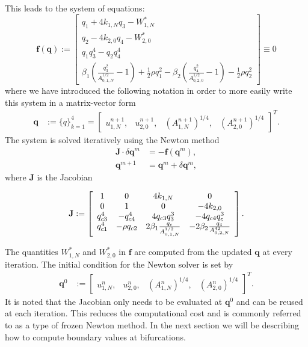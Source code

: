 \documentclass[a4paper, oneside]{discothesis}
\begin{document}
	This leads to the system of equations:
	\begin{equation}
		\mathbf{f}(\mathbf{q}) := \left[\begin{array}{c}
				q_{1}+4 k_{1,N} q_{3}-W_{1,N}^* \\
				q_{2}-4 k_{2,0} q_{4}-W_{2,0}^* \\
				q_{1} q_{3}^4-q_{2} q_{4}^4 \\
				\beta_1\left(\frac{q_{3}^2}{A_{0,1,N}^{1 / 2}}-1\right)+\frac{1}{2} \rho q_{1}^2-\beta_2\left(\frac{q_{4}^2}{A_{0,2,0}^{1 / 2}}-1\right)-\frac{1}{2} \rho q_{2}^2
		\end{array}\right] \equiv 0
	\end{equation}
	where we have introduced the following notation in order to more easily write this system in a matrix-vector form
	\begin{align}
		\mathbf{q}&:= \{q\}_{k=1}^4 = \left[\begin{array}{llll}
				u_{1,N}^{n+1}, & u_{2,0}^{n+1}, & \left( A_{1,N}^{n+1}\right)^{1 / 4}, & \left( A_{2,0}^{n+1} \right)^{1 / 4}
		\end{array}\right]^T. 
			\end{align}
			The system is solved iteratively using the Newton method
			\begin{align}
				\mathbf{J} \cdot \delta \mathbf{q}^m &= -\mathbf{f}\left(\mathbf{q}^m\right), \\
				\mathbf{q}^{m+1} &= \mathbf{q}^m+\delta \mathbf{q}^m,
			\end{align}
			where $\mathbf{J}$ is the Jacobian

			\begin{equation}
				\mathbf{J}:=\left[\begin{array}{c c c c}{{{1}}}&{{0}}&{{{4}k_{1,N}}}&{{0}}\\ {{0}}&{{{1}}}&{{0}}&{{-4k_{2,0}}}\\ {{q_{c3}^{4}}}&{{-q_{c4}^{4}}}&{{4q_{c3}q_{3}^{3}}}&{{-4q_{c4}q_{c}^{3}}}\\ {{q_{c1}^{4}}}&{{-\rho q_{c2}}}&{{2\beta_{1}\frac{q_{c}}{A_{0,1,N}^{1/2}}}}&{{-2\beta_{2}\frac{q_{4}}{A_{0,2,N}^{42}}}}\end{array}\right].
			\end{equation}

			The quantities $W_{1,N}^*$ and $W_{2,0}^*$ in $\mathbf{f}$ are computed from the updated $\mathbf{q}$ at every iteration.
			The initial condition for the Newton solver is set by
			\begin{align}
				\mathbf{q}^0&:=\left[\begin{array}{llll}
						u_{1,N}^{n}, & u_{2,0}^{n}, & \left( A_{1,N}^{n}\right)^{1 / 4}, & \left( A_{2,0}^{n} \right)^{1 / 4}
				\end{array}\right]^T.
					\end{align}
					It is noted that the Jacobian only needs to be evaluated at $\mathbf{q}^0$ and can be reused at each iteration.
					This reduces the computational cost and is commonly referred to as a type of frozen Newton method. \cite{jin2010class,amat2013maximum,amat2018two}
					In the next section we will be describing how to compute boundary values at bifurcations.
\end{document}
